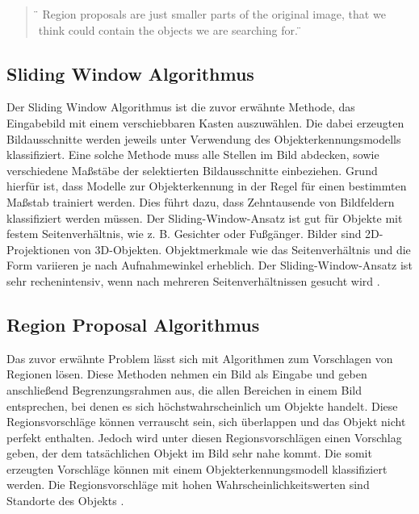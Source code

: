 \begin{quote}
	\"{} Region proposals are just smaller parts of the original image, that we think could contain the objects we are searching for. \cite{selfouly-rcnn} \"{}
\end{quote}

\subsection{Sliding Window Algorithmus}

Der Sliding Window Algorithmus ist die zuvor erwähnte Methode, das Eingabebild mit einem verschiebbaren Kasten auszuwählen. Die dabei erzeugten Bildausschnitte werden jeweils unter Verwendung des Objekterkennungsmodells klassifiziert. Eine solche Methode muss alle Stellen im Bild abdecken, sowie verschiedene Maßstäbe der selektierten Bildausschnitte einbeziehen. Grund hierfür ist, dass Modelle zur Objekterkennung in der Regel für einen bestimmten Maßstab trainiert werden. Dies führt dazu, dass Zehntausende von Bildfeldern klassifiziert werden müssen. Der Sliding-Window-Ansatz ist gut für Objekte mit festem Seitenverhältnis, wie z. B. Gesichter oder Fußgänger. Bilder sind 2D-Projektionen von 3D-Objekten. Objektmerkmale wie das Seitenverhältnis und die Form variieren je nach Aufnahmewinkel erheblich. Der Sliding-Window-Ansatz ist sehr rechenintensiv, wenn nach mehreren Seitenverhältnissen gesucht wird \cite{learnopencv}.

\subsection{Region Proposal Algorithmus}

Das zuvor erwähnte Problem lässt sich mit Algorithmen zum Vorschlagen von Regionen lösen. Diese Methoden nehmen ein Bild als Eingabe und geben anschließend Begrenzungsrahmen aus, die allen Bereichen in einem Bild entsprechen, bei denen es sich höchstwahrscheinlich um Objekte handelt. Diese Regionsvorschläge können verrauscht sein, sich überlappen und das Objekt nicht perfekt enthalten. Jedoch wird unter diesen Regionsvorschlägen einen Vorschlag geben, der dem tatsächlichen Objekt im Bild sehr nahe kommt. Die somit erzeugten Vorschläge können mit einem Objekterkennungsmodell klassifiziert werden. Die Regionsvorschläge mit hohen Wahrscheinlichkeitswerten sind Standorte des Objekts \cite{learnopencv}.

